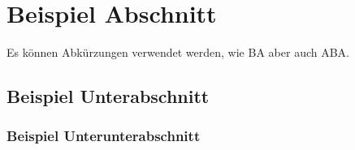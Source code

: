 \section{Beispiel Abschnitt}

Es können Abkürzungen verwendet werden, wie \ac{BA} aber auch \ac{ABA}.

\subsection{Beispiel Unterabschnitt}

\subsubsection{Beispiel Unterunterabschnitt}

\Blindtext{}